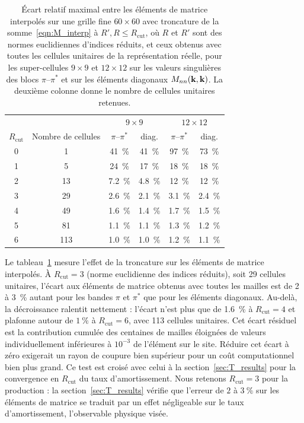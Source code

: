 \begin{table}[htbp]
    \centering
    \caption[Erreur de troncature sur les éléments de
    matrice interpolés.]{Écart relatif maximal entre les éléments de
    matrice interpolés sur une grille fine $60\times60$ avec troncature de
    la somme~\eqref{eqn:M_interp} à $R',R \le R_\text{cut}$, où $R$ et $R'$ sont des normes euclidiennes d'indices réduits, et ceux
    obtenus avec toutes les cellules unitaires de la représentation réelle, pour les
    super-cellules $9\times9$ et $12\times12$ sur les valeurs singulières
    des blocs $\pi$--$\pi^*$ et sur les éléments
    diagonaux $M_{nn}(\mathbf{k},\mathbf{k})$. La deuxième colonne donne le nombre de
    cellules unitaires retenues.}
    \label{tab:rcut_M}
    \begin{tabular}{c c cc cc}
        \hline\hline
        & & \multicolumn{2}{c}{$9\times9$} & \multicolumn{2}{c}{$12\times12$} \\
        $R_\text{cut}$ & Nombre de cellules & $\pi$--$\pi^*$ & diag. & $\pi$--$\pi^*$ & diag. \\
        \hline
        0 & 1   & 41~\%    & 41~\%    & 97~\%    & 73~\%    \\
        1 & 5   & 24~\%    & 17~\%    & 18~\%    & 18~\%    \\
        2 & 13  & 7.2~\% & 4.8~\% & 12~\%    & 12~\%    \\
        3 & 29  & 2.6~\% & 2.1~\% & 3.1~\% & 2.4~\% \\
        4 & 49  & 1.6~\% & 1.4~\% & 1.7~\% & 1.5~\% \\
        5 & 81  & 1.1~\% & 1.1~\% & 1.3~\% & 1.2~\% \\
        6 & 113 & 1.0~\% & 1.0~\% & 1.2~\% & 1.1~\% \\
        \hline\hline
    \end{tabular}
\end{table}
Le tableau~\ref{tab:rcut_M} mesure l'effet de la troncature sur les éléments de matrice interpolés. À $R_\text{cut} =3$ (norme euclidienne des indices réduits), soit 29 cellules unitaires, l'écart aux éléments de matrice obtenus avec toutes les mailles est de 2 à 3~\% autant pour les bandes $\pi$ et $\pi^*$ que pour les éléments diagonaux. Au-delà, la décroissance ralentit nettement : l'écart n'est plus que de 1.6~\% à $R_\text{cut}=4$ et plafonne autour de $1~\%$ à $R_\text{cut}=6$, avec 113 cellules unitaires. Cet écart résiduel est la contribution cumulée des centaines de mailles éloignées de valeurs individuellement inférieures à $10^{-3}$ de l'élément sur le site. Réduire cet écart à zéro exigerait un rayon de coupure bien supérieur pour un coût computationnel bien plus grand. Ce test est croisé avec celui à la section~\ref{sec:T_results} pour la convergence en $R_\text{cut}$ du taux d'amortissement. Nous retenons $R_\text{cut}=3$ pour la production : la section~\ref{sec:T_results} vérifie que l'erreur de $2$ à $3~\%$ sur les éléments de matrice se traduit par un effet négligeable sur le taux d'amortissement, l'observable physique visée.

